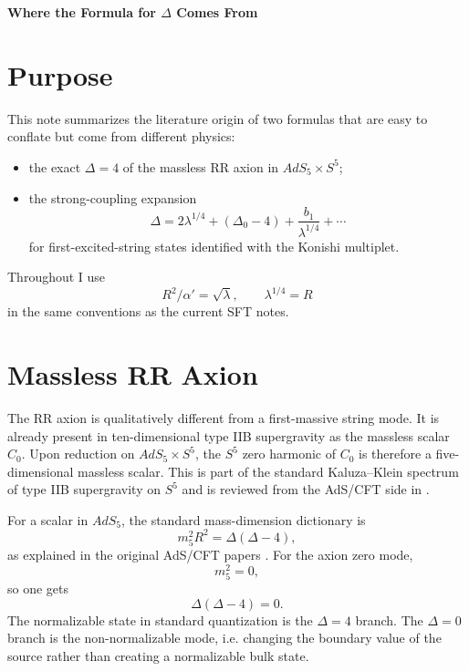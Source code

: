 \documentclass[12pt]{article}
\newcommand{\D}{\Delta}
\begin{document}
\sloppy

\begin{center}
{\Large\bf Where the Formula for $\D$ Comes From}
\end{center}

\section{Purpose}

This note summarizes the literature origin of two formulas that are easy to conflate but
come from different physics:
\begin{itemize}
\item the exact $\D=4$ of the massless RR axion in $AdS_5\times S^5$;
\item the strong-coupling expansion
\begin{equation}
\D = 2\lambda^{1/4} + (\D_0-4) + \frac{b_1}{\lambda^{1/4}} + \cdots
\end{equation}
for first-excited-string states identified with the Konishi multiplet.
\end{itemize}

Throughout I use
\begin{equation}
R^2/\alpha'=\sqrt{\lambda},\qquad \lambda^{1/4}=R
\end{equation}
in the same conventions as the current SFT notes.

\section{Massless RR Axion}

The RR axion is qualitatively different from a first-massive string mode.  It is already present in
ten-dimensional type IIB supergravity as the massless scalar $C_0$.  Upon reduction on
$AdS_5\times S^5$, the $S^5$ zero harmonic of $C_0$ is therefore a five-dimensional massless scalar.
This is part of the standard Kaluza--Klein spectrum of type IIB supergravity on $S^5$
\cite{KimRomansVN,GunaydinMarcus} and is reviewed from the AdS/CFT side in \cite{AharonyReview}.

For a scalar in $AdS_5$, the standard mass-dimension dictionary is
\begin{equation}
m_5^2 R^2 = \D(\D-4),
\end{equation}
as explained in the original AdS/CFT papers \cite{GKP,Witten}.  For the axion zero mode,
\begin{equation}
m_5^2=0,
\end{equation}
so one gets
\begin{equation}
\D(\D-4)=0.
\end{equation}
The normalizable state in standard quantization is the $\D=4$ branch.  The $\D=0$ branch is the
non-normalizable mode, i.e. changing the boundary value of the source rather than creating a normalizable
bulk state.
\end{document}
